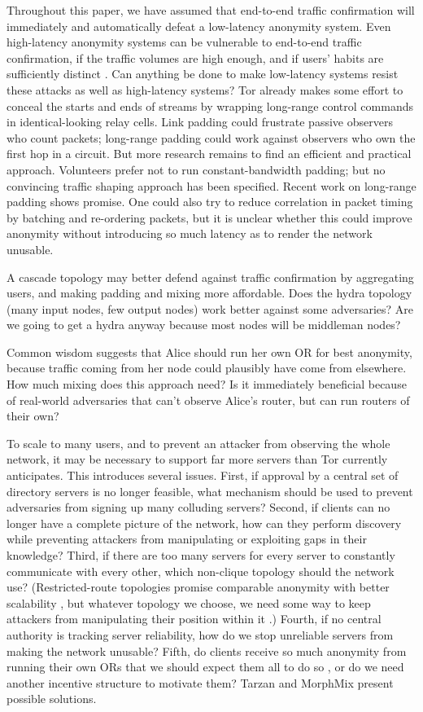 \documentclass[times,10pt,twocolumn]{article}
\begin{document}
Throughout this paper, we have assumed that end-to-end traffic
confirmation will immediately and automatically defeat a low-latency
anonymity system. Even high-latency anonymity systems can be
vulnerable to end-to-end traffic confirmation, if the traffic volumes
are high enough, and if users' habits are sufficiently distinct
\cite{statistical-disclosure,limits-open}. Can anything be done to
make low-latency systems resist these attacks as well as high-latency
systems? Tor already makes some effort to conceal the starts and ends of
streams by wrapping long-range control commands in identical-looking
relay cells. Link padding could frustrate passive observers who count
packets; long-range padding could work against observers who own the
first hop in a circuit. But more research remains to find an efficient
and practical approach. Volunteers prefer not to run constant-bandwidth
padding; but no convincing traffic shaping approach has been
specified. Recent work on long-range padding \cite{defensive-dropping}
shows promise. One could also try to reduce correlation in packet timing
by batching and re-ordering packets, but it is unclear whether this could
improve anonymity without introducing so much latency as to render the
network unusable.

A cascade topology may better defend against traffic confirmation by
aggregating users, and making padding and
mixing more affordable.  Does the hydra topology (many input nodes,
few output nodes) work better against some adversaries? Are we going
to get a hydra anyway because most nodes will be middleman nodes?

Common wisdom suggests that Alice should run her own OR for best
anonymity, because traffic coming from her node could plausibly have
come from elsewhere. How much mixing does this approach need?  Is it
immediately beneficial because of real-world adversaries that can't
observe Alice's router, but can run routers of their own?

To scale to many users, and to prevent an attacker from observing the
whole network, it may be necessary
to support far more servers than Tor currently anticipates.
This introduces several issues.  First, if approval by a central set
of directory servers is no longer feasible, what mechanism should be used
to prevent adversaries from signing up many colluding servers? Second,
if clients can no longer have a complete picture of the network,
how can they perform discovery while preventing attackers from
manipulating or exploiting gaps in their knowledge?  Third, if there
are too many servers for every server to constantly communicate with
every other, which non-clique topology should the network use?
(Restricted-route topologies promise comparable anonymity with better
scalability \cite{danezis-pets03}, but whatever topology we choose, we
need some way to keep attackers from manipulating their position within
it \cite{casc-rep}.) Fourth, if no central authority is tracking
server reliability, how do we stop unreliable servers from making
the network unusable?  Fifth, do clients receive so much anonymity
from running their own ORs that we should expect them all to do so
\cite{econymics}, or do we need another incentive structure to
motivate them?  Tarzan and MorphMix present possible solutions.
\end{document}
